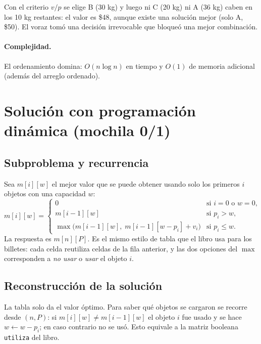 \documentclass[12pt,a4paper]{article}
\begin{document}
Con el criterio $v/p$ se elige B (30 kg) y luego ni C (20 kg) ni A (36 kg) caben en los 10 kg restantes: el valor es \$48, aunque existe una solución mejor (solo A, \$50). El voraz tomó una decisión irrevocable que bloqueó una mejor combinación.

\paragraph{Complejidad.} El ordenamiento domina: $O(n\log n)$ en tiempo y $O(1)$ de memoria adicional (además del arreglo ordenado).

\section{Solución con programación dinámica (mochila 0/1)}

\subsection{Subproblema y recurrencia}
Sea $m[i][w]$ el mejor valor que se puede obtener usando solo los primeros $i$ objetos con una capacidad $w$:
\[
m[i][w] =
\begin{cases}
0 & \text{si } i=0 \text{ o } w=0,\\[2pt]
m[i-1][w] & \text{si } p_i > w,\\[2pt]
\max\bigl(m[i-1][w],\; m[i-1][w-p_i] + v_i\bigr) & \text{si } p_i \le w.
\end{cases}
\]
La respuesta es $m[n][P]$. Es el mismo estilo de tabla que el libro usa para los billetes: cada celda reutiliza celdas de la fila anterior, y las dos opciones del $\max$ corresponden a \emph{no usar} o \emph{usar} el objeto $i$.

\subsection{Reconstrucción de la solución}
La tabla solo da el valor óptimo. Para saber qué objetos se cargaron se recorre desde $(n,P)$: si $m[i][w]\neq m[i-1][w]$ el objeto $i$ fue usado y se hace $w \leftarrow w-p_i$; en caso contrario no se usó. Esto equivale a la matriz booleana \texttt{utiliza} del libro.
\end{document}
